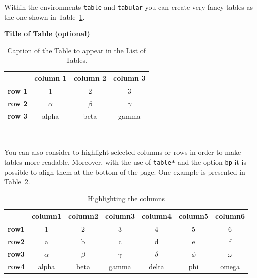 \documentclass{config/PoliMi3i_thesis}
\begin{document}
Within the environments \texttt{table} and  \texttt{tabular} you can create very fancy tables as the one shown in Table~\ref{table:example}.
\begin{table}[H]
    \caption*{\textbf{Title of Table (optional)}}
    \centering
    \begin{tabular}{|p{3em} c c c |}
        \hline
        \rowcolor{bluepoli!40} %
                       & \textbf{column 1} & \textbf{column 2} & \textbf{column 3} \T\B \\
        \hline \hline
        \textbf{row 1} & 1                 & 2                 & 3 \T\B                 \\
        \textbf{row 2} & $\alpha$          & $\beta$           & $\gamma$ \T\B          \\
        \textbf{row 3} & alpha             & beta              & gamma \B               \\
        \hline
    \end{tabular}
    \\[10pt]
    \caption{Caption of the Table to appear in the List of Tables.}
    \label{table:example}
\end{table}

You can also consider to highlight selected columns or rows in order to make tables more readable.
Moreover, with the use of \texttt{table*} and the option \texttt{bp} it is possible to align them at the bottom of the page. One example is presented in Table~\ref{table:exampleC}.

\begin{table}[H]
    \centering
    \begin{tabular}{|p{3em} | c | c | c | c | c | c|}
        \hline
                      & \textbf{column1} & \textbf{column2} & \textbf{column3} & \textbf{column4} & \textbf{column5} & \textbf{column6} \T\B \\
        \hline \hline
        \textbf{row1} & 1                & 2                & 3                & 4                & 5                & 6 \T\B                \\
        \textbf{row2} & a                & b                & c                & d                & e                & f \T\B                \\
        \textbf{row3} & $\alpha$         & $\beta$          & $\gamma$         & $\delta$         & $\phi$           & $\omega$ \T\B         \\
        \textbf{row4} & alpha            & beta             & gamma            & delta            & phi              & omega \B              \\
        \hline
    \end{tabular}
    \\[10pt]
    \caption{Highlighting the columns}
    \label{table:exampleC}
\end{table}
\end{document}
